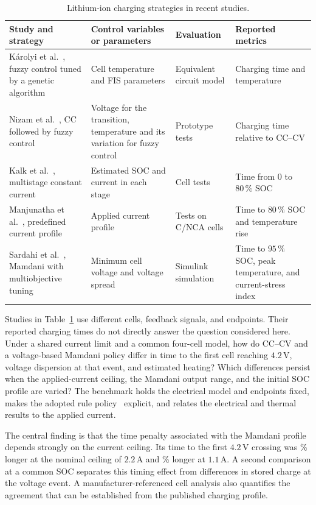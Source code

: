 \documentclass[a4paper,10pt,twocolumn]{article}
\begin{document}
\begin{table}[t]
\centering
\small
\caption{Lithium-ion charging strategies in recent studies.}
\label{tab:literature}
\begin{tabular}{@{}p{}p{}p{}p{}@{}}
\toprule
Study and strategy & Control variables or parameters & Evaluation & Reported metrics \\
\midrule
Károlyi et al.~\cite{karolyi2022}, fuzzy control tuned by a genetic algorithm &
Cell temperature and FIS parameters &
Equivalent circuit model &
Charging time and temperature \\
Nizam et al.~\cite{nizam2022}, CC followed by fuzzy control &
Voltage for the transition, temperature and its variation for fuzzy control &
Prototype tests &
Charging time relative to CC--CV \\
Kalk et al.~\cite{kalk2024}, multistage constant current &
Estimated SOC and current in each stage &
Cell tests &
Time from $0$ to $80\,\%$ SOC \\
Manjunatha et al.~\cite{perfil2024}, predefined current profile &
Applied current profile &
Tests on C/NCA cells &
Time to $80\,\%$ SOC and temperature rise \\
Sardahi et al.~\cite{sardahi2026}, Mamdani with multiobjective tuning &
Minimum cell voltage and voltage spread &
Simulink simulation &
Time to $95\,\%$ SOC, peak temperature, and current-stress index \\
\bottomrule
\end{tabular}
\end{table}

Studies in Table~\ref{tab:literature} use different cells, feedback signals, and endpoints. Their reported charging times do not directly answer the question considered here. Under a shared current limit and a common four-cell model, how do CC--CV and a voltage-based Mamdani policy differ in time to the first cell reaching $4.2\,\mathrm{V}$, voltage dispersion at that event, and estimated heating? Which differences persist when the applied-current ceiling, the Mamdani output range, and the initial SOC profile are varied? The benchmark holds the electrical model and endpoints fixed, makes the adopted rule policy~\cite{chuang} explicit, and relates the electrical and thermal results to the applied current.

The central finding is that the time penalty associated with the Mamdani profile depends strongly on the current ceiling. Its time to the first $4.2\,\mathrm{V}$ crossing was \RelativeExtraFZ\% longer at the nominal ceiling of $2.2\,\mathrm{A}$ and \LateLowCap\% longer at $1.1\,\mathrm{A}$. A second comparison at a common SOC separates this timing effect from differences in stored charge at the voltage event. A manufacturer-referenced cell analysis also quantifies the agreement that can be established from the published charging profile.
\end{document}
